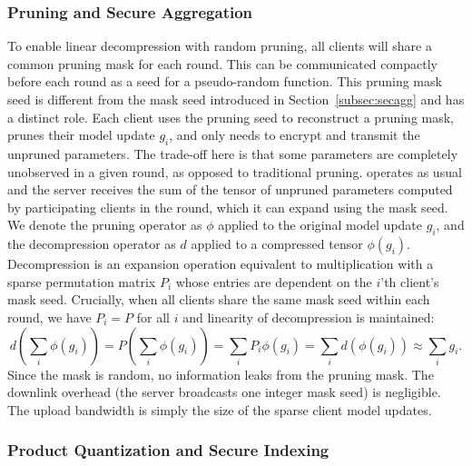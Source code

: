 \subsubsection{Pruning and Secure Aggregation}

To enable linear decompression with random pruning, all clients will share a common pruning mask for each round.
This can be communicated compactly before each round as a seed for a pseudo-random function.
This pruning mask seed is different from the \SecAgg mask seed introduced in Section~\ref{subsec:secagg} and has a distinct role.
Each client uses the pruning seed to reconstruct a pruning mask, prunes their model update $g_i$, and only needs to encrypt and transmit the unpruned parameters.
The trade-off here is that some parameters are completely unobserved in a given round, as opposed to traditional pruning.
\SecAgg operates as usual and the server receives the sum of the tensor of unpruned parameters computed by participating clients in the round, which it can expand using the mask seed.
We denote the pruning operator as $\phi$ applied to the original model update $g_i$, and the decompression operator as $d$ applied to a compressed tensor $\phi(g_i)$. Decompression is an expansion operation equivalent to multiplication with a sparse permutation matrix $P_i$ whose entries are dependent on the $i$'th client's mask seed.
Crucially, when all clients share the same mask seed within each round, we have $P_i = P$ for all $i$ and linearity of decompression is maintained:
\begin{equation*} \textstyle
    d \left(\sum_i \phi(g_i) \right) = P \left( \sum_i \phi(g_i) \right) = \sum_i P_i\phi(g_i) = \sum_i d(\phi(g_i)) \approx \sum_i g_i.
\end{equation*}
%
 Since the mask is random, no information leaks from the pruning mask. The downlink overhead (the server broadcasts one integer mask seed) is negligible. The upload bandwidth is simply the size of the sparse client model updates. 

\subsubsection{Product Quantization and Secure Indexing}

